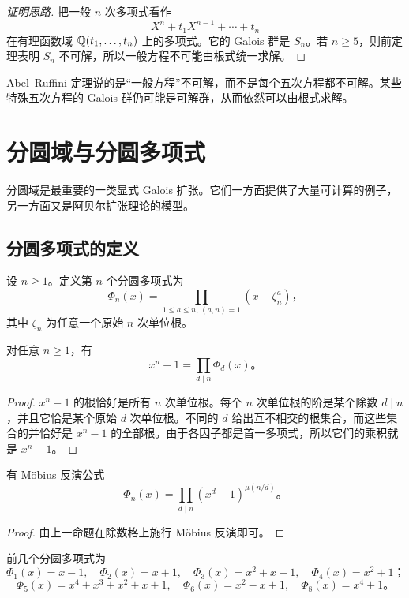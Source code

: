 \begin{proof}[证明思路]
把一般 $n$ 次多项式看作
\[
X^n+t_1X^{n-1}+\cdots+t_n
\]
在有理函数域 $\mathbb{Q}(t_1,\dots,t_n)$ 上的多项式。它的 Galois 群是 $S_n$。若 $n\ge5$，则前定理表明 $S_n$ 不可解，所以一般方程不可能由根式统一求解。
\end{proof}

\begin{remark}
Abel--Ruffini 定理说的是“一般方程”不可解，而不是每个五次方程都不可解。某些特殊五次方程的 Galois 群仍可能是可解群，从而依然可以由根式求解。
\end{remark}

\section{分圆域与分圆多项式}

分圆域是最重要的一类显式 Galois 扩张。它们一方面提供了大量可计算的例子，另一方面又是阿贝尔扩张理论的模型。

\subsection*{分圆多项式的定义}

\begin{definition}
设 $n\ge1$。定义第 $n$ 个分圆多项式为
\[
\Phi_n(x)=\prod_{1\le a\le n,\,(a,n)=1}(x-\zeta_n^a)，
\]
其中 $\zeta_n$ 为任意一个原始 $n$ 次单位根。
\end{definition}

\begin{proposition}
对任意 $n\ge1$，有
\[
x^n-1=\prod_{d\mid n}\Phi_d(x)。
\]
\end{proposition}

\begin{proof}
$ x^n-1 $ 的根恰好是所有 $n$ 次单位根。每个 $n$ 次单位根的阶是某个除数 $d\mid n$，并且它恰是某个原始 $d$ 次单位根。不同的 $d$ 给出互不相交的根集合，而这些集合的并恰好是 $x^n-1$ 的全部根。由于各因子都是首一多项式，所以它们的乘积就是 $x^n-1$。
\end{proof}

\begin{corollary}
有 Möbius 反演公式
\[
\Phi_n(x)=\prod_{d\mid n}(x^d-1)^{\mu(n/d)}。
\]
\end{corollary}

\begin{proof}
由上一命题在除数格上施行 Möbius 反演即可。
\end{proof}

\begin{example}
前几个分圆多项式为
\[
\Phi_1(x)=x-1,
\quad
\Phi_2(x)=x+1,
\quad
\Phi_3(x)=x^2+x+1,
\quad
\Phi_4(x)=x^2+1；
\]
\[
\Phi_5(x)=x^4+x^3+x^2+x+1,
\quad
\Phi_6(x)=x^2-x+1,
\quad
\Phi_8(x)=x^4+1。
\]
\end{example}


